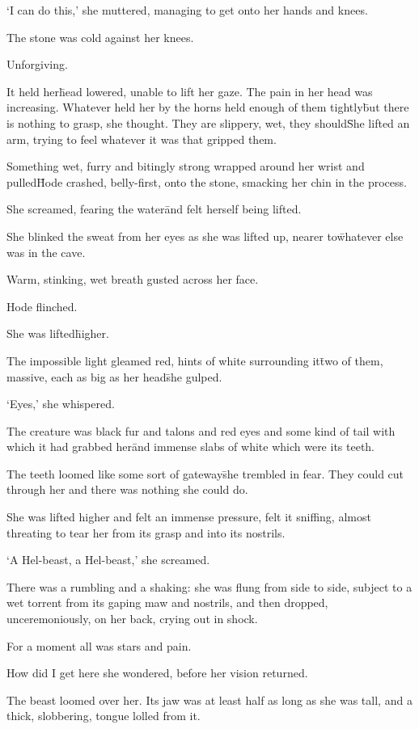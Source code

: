 ‘I can do this,’ she muttered, managing to get onto her hands and knees.

The stone was cold against her 
knees.

Unforgiving.

It held her\=head lowered, unable to lift her gaze. The pain in her head was increasing. Whatever held 
her by the horns held enough of them tightly\=but there is nothing to grasp, she thought. They are 
slippery, wet, they should\=

She lifted an arm, trying to feel whatever it was that gripped them.

Something wet, furry and bitingly strong wrapped around her wrist and pulled\=Hode crashed, 
belly-first, onto the stone, smacking her chin in the process.

She screamed, fearing the water\=and felt herself being lifted.

She blinked the sweat from her eyes as she was lifted up, nearer to\=whatever else was in the cave.

Warm, stinking, wet breath gusted across her face.

Hode flinched.

She was lifted\=higher.

The impossible light gleamed red, hints of white surrounding it\=two of them, massive, each as big as 
her head\=she gulped.

‘Eyes,’ she whispered.

The creature was black fur and talons and red eyes and some kind of tail with which it had grabbed her\=and
immense slabs of white which were its teeth.

The teeth loomed like some sort of gateway\=she trembled in fear. They could cut through her and there 
was nothing she could do.

She was lifted higher and felt an immense pressure, felt it sniffing, almost threating to tear her from 
its grasp and into its nostrils.

‘A Hel-beast, a Hel-beast,’ she screamed.

There was a rumbling and a shaking: she was flung from side to side, subject to a wet torrent from its 
gaping maw and nostrils, and then dropped, unceremoniously, on her back, crying out in shock.

For a moment all was stars and pain.

How did I get here she wondered, before her vision returned.

The beast loomed over her. Its jaw was at least half as long as she was tall, and a thick, slobbering, 
tongue lolled from it.

